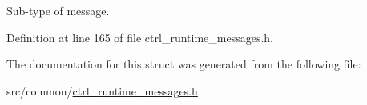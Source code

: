 Sub-\/type of message. 



Definition at line 165 of file ctrl\-\_\-runtime\-\_\-messages.\-h.



The documentation for this struct was generated from the following file\-:\begin{DoxyCompactItemize}
\item 
src/common/\hyperlink{ctrl__runtime__messages_8h}{ctrl\-\_\-runtime\-\_\-messages.\-h}\end{DoxyCompactItemize}
